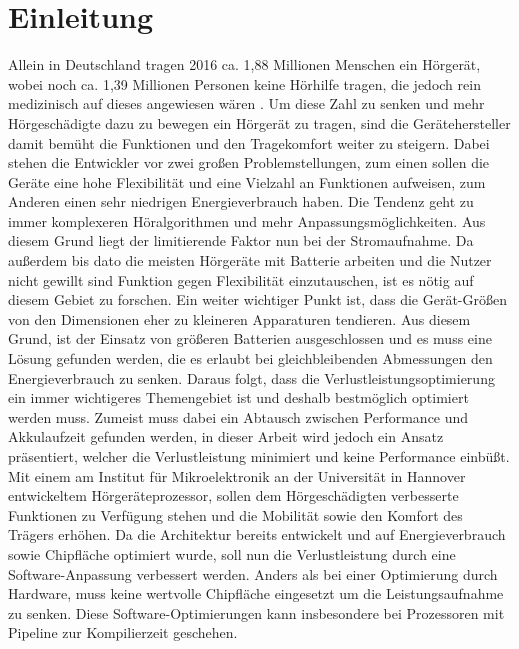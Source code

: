
\thispagestyle{empty}
%
\chapter{Einleitung}
\label{chap:introduction}
Allein in Deutschland tragen 2016 ca. 1,88 Millionen Menschen ein Hörgerät, wobei noch ca. 1,39 Millionen Personen keine Hörhilfe tragen, die jedoch rein medizinisch auf dieses angewiesen wären \cite{statistica}. Um diese Zahl zu senken und mehr Hörgeschädigte dazu zu bewegen ein Hörgerät zu tragen, sind die Gerätehersteller damit bemüht die Funktionen und den Tragekomfort weiter zu steigern.
Dabei stehen die Entwickler vor zwei großen Problemstellungen, zum einen sollen die Geräte eine hohe Flexibilität und eine Vielzahl an Funktionen aufweisen, zum Anderen einen sehr niedrigen Energieverbrauch haben\cite{lee2007low}. Die Tendenz geht zu immer komplexeren Höralgorithmen und mehr Anpassungsmöglichkeiten. Aus diesem Grund liegt der limitierende Faktor nun bei der Stromaufnahme.
Da außerdem bis dato die meisten Hörgeräte mit Batterie arbeiten und die Nutzer nicht gewillt sind Funktion gegen Flexibilität einzutauschen, ist es nötig auf diesem Gebiet zu forschen. Ein weiter wichtiger Punkt ist, dass die Gerät-Größen von den Dimensionen eher zu kleineren Apparaturen tendieren. Aus diesem Grund, ist der Einsatz von größeren Batterien ausgeschlossen und es muss eine Lösung gefunden werden, die es erlaubt bei gleichbleibenden Abmessungen den Energieverbrauch zu senken. Daraus folgt, dass die Verlustleistungsoptimierung ein immer wichtigeres Themengebiet ist und deshalb bestmöglich optimiert werden muss. 
Zumeist muss dabei ein Abtausch zwischen Performance und Akkulaufzeit gefunden werden, in dieser Arbeit wird jedoch ein Ansatz präsentiert, welcher die Verlustleistung minimiert und keine Performance einbüßt.\\
Mit einem am Institut für Mikroelektronik an der Universität in Hannover entwickeltem Hörgeräteprozessor, sollen dem Hörgeschädigten verbesserte Funktionen zu Verfügung stehen und die Mobilität sowie den Komfort des Trägers erhöhen. Da die Architektur bereits entwickelt und auf Energieverbrauch sowie Chipfläche optimiert wurde, soll nun die Verlustleistung durch eine Software-Anpassung verbessert werden. Anders als bei einer Optimierung durch Hardware, muss keine wertvolle Chipfläche eingesetzt um die Leistungsaufnahme zu senken. Diese Software-Optimierungen kann insbesondere bei Prozessoren mit Pipeline zur Kompilierzeit geschehen.\\
